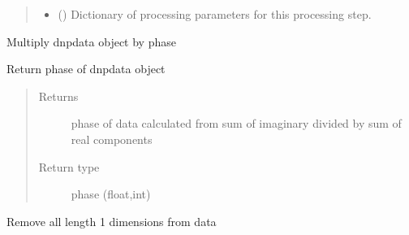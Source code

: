 \documentclass[letterpaper,10pt,english]{sphinxmanual}
\begin{document}
\begin{fulllineitems}
\begin{fulllineitems}
\begin{quote}
\begin{description}
\begin{itemize}
\item {} 
 () \sphinxhyphen{}\sphinxhyphen{} Dictionary of processing parameters for this processing step.

\end{itemize}

\end{description}\end{quote}

\end{fulllineitems}


\begin{fulllineitems}
\label{\detokenize{dnpData:dnpLab.dnpdata.autophase}}
Multiply dnpdata object by phase

\end{fulllineitems}


\begin{fulllineitems}
\label{\detokenize{dnpData:dnpLab.dnpdata.phase}}
Return phase of dnpdata object
\begin{quote}\begin{description}
\item[{Returns}] \leavevmode
phase of data calculated from sum of imaginary divided by sum of real components

\item[{Return type}] \leavevmode
phase (float,int)

\end{description}\end{quote}

\end{fulllineitems}


\begin{fulllineitems}
\label{\detokenize{dnpData:dnpLab.dnpdata.squeeze}}
Remove all length 1 dimensions from data


\end{fulllineitems}
\end{fulllineitems}
\end{document}
